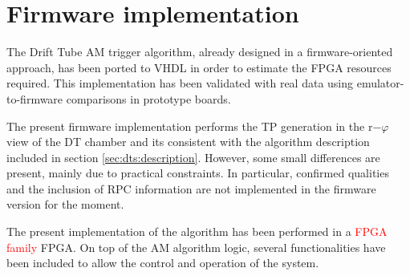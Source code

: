 \documentclass[../main.tex]{subfiles}
\begin{document}
\section{Firmware implementation}

The Drift Tube AM trigger algorithm, already designed in a firmware-oriented approach, has been ported to VHDL in order to estimate the FPGA resources required. This implementation has been validated with real data using emulator-to-firmware comparisons in prototype boards.

The present firmware implementation performs the TP generation in the r$-\varphi$ view of the DT chamber and its consistent with the algorithm description included in section \ref{sec:dts:description}. However, some small differences are present, mainly due to practical constraints. In particular, confirmed qualities and the inclusion of RPC information are not implemented in the firmware version for the moment. 

The present implementation of the algorithm has been performed in a \textcolor{red}{FPGA family} FPGA. On top of the AM algorithm logic, several functionalities have been included to allow the control and operation of the system.





%
%
\end{document}
